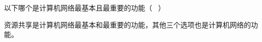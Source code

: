 \question 以下哪个是计算机网络最基本且最重要的功能（ ~）
\par{}
\begin{solution}资源共享是计算机网络最基本和最重要的功能，其他三个选项也是计算机网络的功能。
\end{solution}
